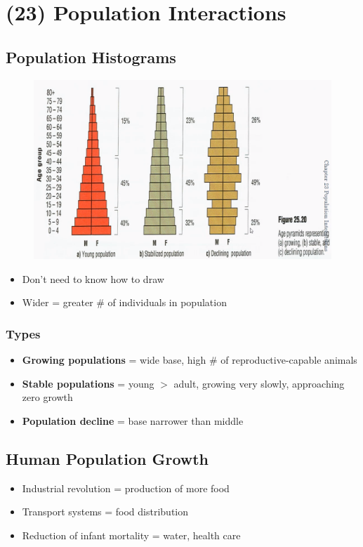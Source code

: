 \documentclass[a4paper,12pt]{article}
\begin{document}
\section{(23) Population Interactions}
\subsection{Population Histograms}
\begin{figure}[H]
    \centering
    \includegraphics[width=\textwidth]{hist}
\end{figure}
\begin{itemize}
    \item{Don't need to know how to draw}
    \item{Wider = greater \# of individuals in population}
\end{itemize}

\subsubsection{Types}
\begin{itemize}
    \item{\textbf{Growing populations} = wide base, high \# of reproductive-capable animals}
    \item{\textbf{Stable populations} = young $>$ adult, growing very slowly, approaching zero growth}
    \item{\textbf{Population decline} = base narrower than middle}
\end{itemize}

\subsection{Human Population Growth}
\begin{itemize}
    \item{Industrial revolution = production of more food}
    \item{Transport systems = food distribution}
    \item{Reduction of infant mortality = water, health care}
\end{itemize}
\end{document}
